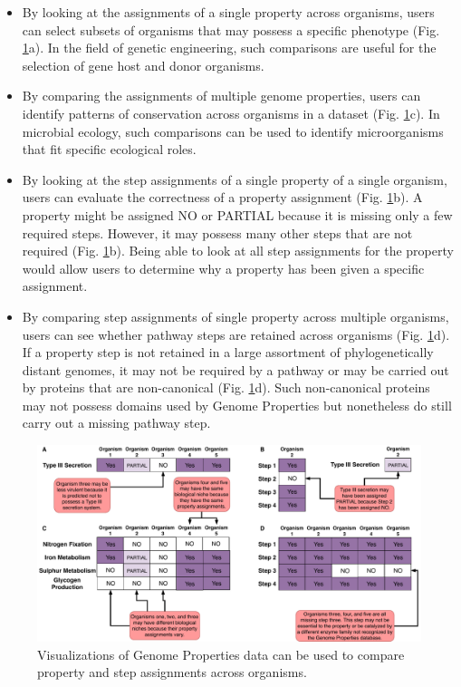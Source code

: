 \begin{itemize}
\item By looking at the assignments of a single property across organisms, users can select subsets of organisms that may possess a specific phenotype (Fig. \ref{fig:client-analysis-types}a). In the field of genetic engineering, such comparisons are useful for the selection of gene host and donor organisms.
\item By comparing the assignments of multiple genome properties, users can identify patterns of conservation across organisms in a dataset (Fig. \ref{fig:client-analysis-types}c). In microbial ecology, such comparisons can be used to identify microorganisms that fit specific ecological roles.
\item By looking at the step assignments of a single property of a single organism, users can evaluate the correctness of a property assignment (Fig. \ref{fig:client-analysis-types}b). A property might be assigned NO or PARTIAL because it is missing only a few required steps. However, it may possess many other steps that are not required (Fig. \ref{fig:client-analysis-types}b). Being able to look at all step assignments for the property would allow users to determine why a property has been given a specific assignment.
\item By comparing step assignments of single property across multiple organisms, users can see whether pathway steps are retained across organisms (Fig. \ref{fig:client-analysis-types}d). If a property step is not retained in a large assortment of phylogenetically distant genomes, it may not be required by a pathway or may be carried out by proteins that are non-canonical (Fig. \ref{fig:client-analysis-types}d). Such non-canonical proteins may not possess domains used by Genome Properties but nonetheless do still carry out a missing pathway step.
\end{itemize}

\begin{figure}[!ht]
  \centering
	\includegraphics[width=\textwidth]{media/analysis_types.pdf}
	 \caption{Visualizations of Genome Properties data can be used to compare property and step assignments across organisms.}
	 \label{fig:client-analysis-types}
\end{figure}

